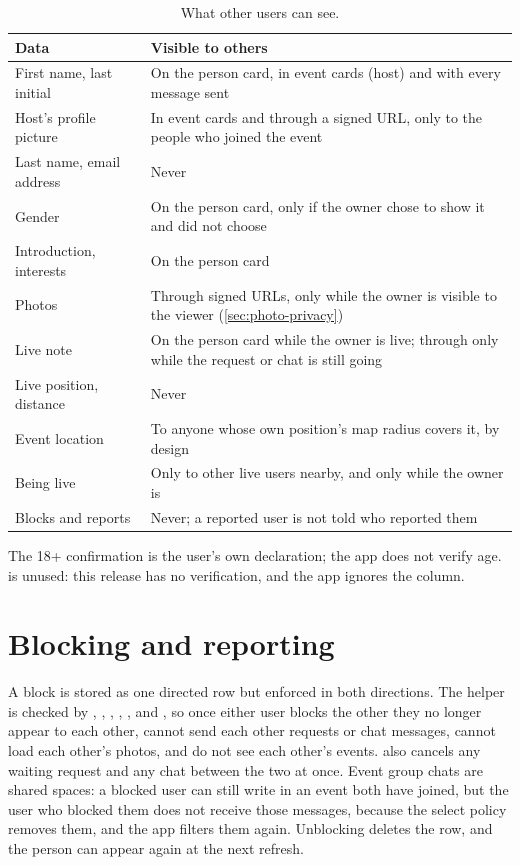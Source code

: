 \begin{table}[ht]
  \centering
  \caption{What other users can see.}
  \label{tab:exposure}
  \tablefont
  \begin{tabularx}{\textwidth}{@{}L{42mm}Y@{}}
    \toprule
    \textsf{\textbf{Data}} & \textsf{\textbf{Visible to others}} \\
    \midrule
    First name, last initial & On the person card, in event cards (host) and with every message sent \\
    Host's profile picture & In event cards and through a signed URL, only to the people who joined the event \\
    Last name, email address & Never \\
    Gender & On the person card, only if the owner chose to show it and did not choose  \\
    Introduction, interests & On the person card \\
    Photos & Through signed URLs, only while the owner is visible to the viewer (\cref{sec:photo-privacy}) \\
    Live note & On the person card while the owner is live; through  only while the request or chat is still going \\
    Live position, distance & Never \\
    Event location & To anyone whose own position's map radius covers it, by design \\
    Being live & Only to other live users nearby, and only while the owner is  \\
    Blocks and reports & Never; a reported user is not told who reported them \\
    \bottomrule
  \end{tabularx}
\end{table}

The 18+ confirmation is the user's own declaration; the app does not verify age.  is
unused: this release has no verification, and the app ignores the column.

\section{Blocking and reporting}
\label{sec:blocking-reporting}

A block is stored as one directed row but enforced in both directions. The helper
 is checked by , , ,
, ,  and , so once either
user blocks the other they no longer appear to each other, cannot send each other requests or chat
messages, cannot load each other's photos, and do not see each other's events.  also
cancels any waiting request and any chat between the two at once. Event group chats are shared spaces: a
blocked user can still write in an event both have joined, but the user who blocked them does not receive
those messages, because the  select policy removes them, and the app filters them again.
Unblocking deletes the row, and the person can appear again at the next refresh.

